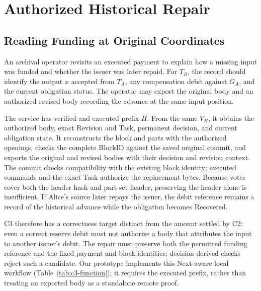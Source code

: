 \section{Authorized Historical Repair}
\label{sec:history}

\subsection{Reading Funding at Original Coordinates}
\label{sec:protocol-reader}

An archival operator revisits an executed payment to explain how a missing input was funded and whether the issuer was later repaid. For $T_B$, the record should identify the output $x$ accepted from $T_A$, any compensation debit against $G_A$, and the current obligation status. The operator may export the original body and an authorized revised body recording the advance at the same input position.

The service has verified and executed prefix $H$. From the same $V_H$,
it obtains the authorized body, exact Revision and Task, permanent
decision, and current obligation state. It reconstructs the block and
parts with the authorized openings, checks the complete BlockID against
the saved original commit, and exports the original and revised bodies
with their decision and revision context. The commit checks compatibility
with the existing block identity; executed commands and the exact Task
authorize the replacement bytes. Because votes cover both the header
hash and part-set header, preserving the header alone is insufficient.
If Alice's source later repays the issuer, the debit reference remains
a record of the historical advance while the obligation becomes Recovered.

C3 therefore has a correctness target distinct from the amount settled
by C2: even a correct reserve debit must not authorize a body that
attributes the input to another issuer's debit. The repair must preserve
both the permitted funding reference and the fixed payment and block
identities; decision-derived checks reject such a candidate.
Our prototype implements this Next-aware local workflow
(Table~\ref{tab:c3-function}); it requires the executed prefix, rather
than treating an exported body as a standalone remote proof.

